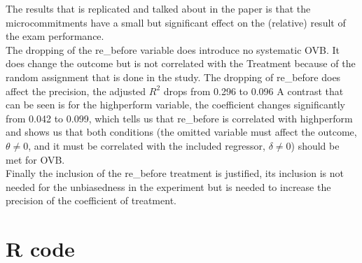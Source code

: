\documentclass[12pt]{article}
\begin{document}
The results that is replicated and talked about in the paper is that the microcommitments have a small but significant effect on the (relative) result of the exam performance.\\
\newline
The dropping of the re_before variable does introduce no systematic OVB. It does change the outcome but is not correlated with the Treatment because of the random assignment that is done in the study.
\newline
The dropping of re_before does affect the precision, the adjusted $R^2$ drops from 0.296 to 0.096
\newline
A contrast that can be seen is for the highperform variable, the coefficient changes significantly from 0.042 to 0.099, which tells us that re_before is correlated with highperform and shows us that both conditions (the omitted variable must affect the outcome, $\theta \neq 0$, and it must be correlated with the included regressor, $\delta \neq 0$) should be met for OVB.\\
\newline
Finally the inclusion of the re_before treatment is justified, its inclusion is not needed for the unbiasedness in the experiment but is needed to increase the precision of the coefficient of treatment. 



\printbibliography

\appendix
\section{R code}
\label{app:code}
\end{document}
